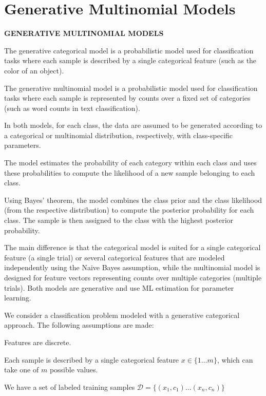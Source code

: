 
\section*{Generative Multinomial Models}

\setlength{\parindent}{0pt}  %
\setlength{\parskip}{0.7em}  %

\textbf{GENERATIVE MULTINOMIAL MODELS}

The generative categorical model is a probabilistic model used for classification tasks where each sample is described by a single categorical feature (such as the color of an object).

The generative multinomial model is a probabilistic model used for classification tasks where each sample is represented by counts over a fixed set of categories (such as word counts in text classification).

In both models, for each class, the data are assumed to be generated according to a categorical or multinomial distribution, respectively, with class-specific parameters.

The model estimates the probability of each category within each class and uses these probabilities to compute the likelihood of a new sample belonging to each class.

Using Bayes' theorem, the model combines the class prior and the class likelihood (from the respective distribution) to compute the posterior probability for each class. The sample is then assigned to the class with the highest posterior probability.

The main difference is that the categorical model is suited for a single categorical feature (a single trial) or several categorical features that are modeled independently using the Naive Bayes assumption, while the multinomial model is designed for feature vectors representing counts over multiple categories (multiple trials). Both models are generative and use ML estimation for parameter learning.

We consider a classification problem modeled with a generative categorical approach. The following assumptions are made:

Features are discrete.

Each sample is described by a single categorical feature $x \in \{1 \ldots m\}$, which can take one of $m$ possible values.

We have a set of labeled training samples $\mathcal{D} = \{(x_1, c_1) \ldots (x_n, c_n)\}$

